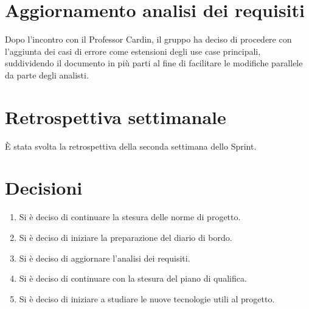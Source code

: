 \documentclass[a4paper,12pt]{article}
\begin{document}
\section{Aggiornamento analisi dei requisiti}
Dopo l'incontro con il Professor Cardin, il gruppo ha deciso di procedere con l'aggiunta dei casi di errore come estensioni degli use case principali, suddividendo il documento
 in più parti al fine di facilitare le modifiche parallele da parte degli analisti.

\section{Retrospettiva settimanale}
È stata svolta la retrospettiva della seconda settimana dello Sprint.

\section{Decisioni}
\begin{enumerate}[noitemsep]
    \item Si è deciso di continuare la stesura delle norme di progetto.
    \item Si è deciso di iniziare la preparazione del diario di bordo.
    \item Si è deciso di aggiornare l'analisi dei requisiti.
    \item Si è deciso di continuare con la stesura del piano di qualifica.
    \item Si è deciso di iniziare a studiare le nuove tecnologie utili al progetto.
\end{enumerate}

\vspace{2cm}
\end{document}
